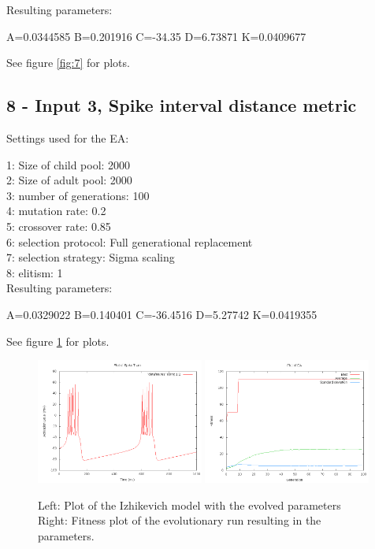 \documentclass[11pt]{article}
\begin{document}
Resulting parameters:

A=0.0344585 B=0.201916 C=-34.35 D=6.73871 K=0.0409677

See figure \ref{fig:7} for plots.

\subsection*{8 - Input 3, Spike interval distance metric}

Settings used for the EA:

1: Size of child pool: 2000\\
2: Size of adult pool: 2000\\
3: number of generations: 100\\
4: mutation rate: 0.2\\
5: crossover rate: 0.85\\
6: selection protocol: Full generational replacement\\
7: selection strategy: Sigma scaling\\
8: elitism: 1\\

Resulting parameters:

A=0.0329022 B=0.140401 C=-36.4516 D=5.27742 K=0.0419355

See figure \ref{fig:8} for plots.

\begin{figure}
\begin{center}
\mbox{\includegraphics[width=0.49\textwidth]{images/8-res.png}}
\mbox{\includegraphics[width=0.49\textwidth]{images/8-fit.png}}
\end{center}
\caption{Left: Plot of the Izhikevich model with the evolved parameters\\
Right: Fitness plot of the evolutionary run resulting in the parameters.}
\label{fig:8}
\end{figure}
\end{document}
